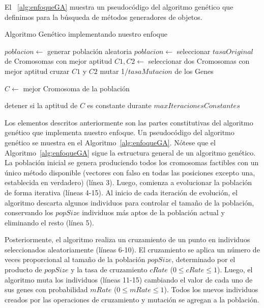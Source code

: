 El ~\ref{alg:enfoqueGA} muestra un pseudocódigo del algoritmo genético que definimos para la búsqueda de métodos generadores de objetos.


\begin{algorithm}
  \caption{Algoritmo Genético implementando nuestro enfoque}
  \label{alg:enfoqueGA}
  \begin{algorithmic}[1]
  
  \STATE $poblacion \gets $ generar población aleatoria
      \STATE $poblacion \leftarrow $ seleccionar $tasaOriginal$ de Cromosomas con mejor aptitud
          \STATE $C1, C2 \gets $ seleccionar dos Cromosomas con mejor aptitud
          \STATE cruzar $C1$ y $C2$
      \ENDFOR
          \STATE mutar 1/$tasaMutacion$ de los Genes
      \ENDFOR
  \ENDFOR
  
  \STATE $C \gets$ mejor Cromosoma de la población
  
  \STATE detener si la aptitud de $C$ es constante durante $maxIteracionesConstantes$
  
\end{algorithmic}
\end{algorithm}


Los elementos descritos anteriormente son las partes constitutivas del algoritmo genético que implementa nuestro enfoque. Un pseudocódigo del algoritmo genético se muestra en el Algoritmo~\ref{alg:enfoqueGA}. 
Nótese que el Algoritmo~\ref{alg:enfoqueGA} sigue la estructura general de un algoritmo genético. 
La población inicial se genera produciendo todos los cromosomas factibles con un único método disponible 
(vectores con falso en todas las posiciones excepto una, establecida en verdadero) (línea 3). 
Luego, comienza a evolucionar la población de forma iterativa (líneas 4-15). 
Al inicio de cada iteración de evolución, el algoritmo descarta algunos individuos para controlar el tamaño de la población, 
conservando los $popSize$ individuos más aptos de la población actual y eliminando el resto (línea 5). 

Posteriormente, el algoritmo realiza un cruzamiento de un punto en individuos seleccionados aleatoriamente (líneas 6-10). 
El cruzamiento se aplica un número de veces proporcional al tamaño de la población $popSize$, 
determinado por el producto de $popSize$ y la tasa de cruzamiento $cRate$ ($0 \leq cRate \leq 1$). 
Luego, el algoritmo muta los individuos (líneas 11-15) cambiando el valor de cada uno de sus genes con probabilidad $mRate$ ($0 \leq mRate \leq 1$). 
Todos los nuevos individuos creados por las operaciones de cruzamiento y mutación se agregan a la población.

